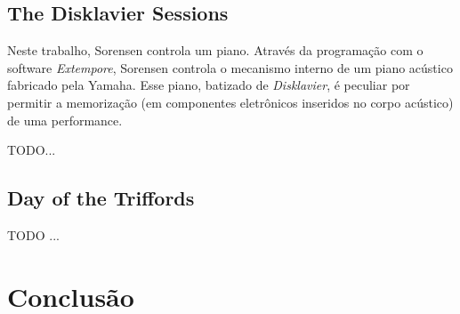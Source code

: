 \documentclass[
	12pt,				%
	openright,			%
	twoside,			%
	a4paper,			%
	english,			%
	french,				%
	spanish,			%
        italian,                        %
	brazil				%
	]{abntex2}
\begin{document}
\section{The Disklavier Sessions}

Neste trabalho, Sorensen controla um piano. Através da programação com o software \emph{Extempore}, Sorensen controla o mecanismo interno de um piano acústico fabricado pela Yamaha. Esse piano, batizado de \emph{Disklavier}, é peculiar por permitir a memorização (em componentes eletrônicos inseridos no corpo acústico) de uma performance.

TODO...

\section{Day of the Triffords}\label{sec:dayofthetriffords}

TODO ...
\chapter{Conclusão}


%
\postextual



%
%



\begin{apendicesenv}

%
%
%


\end{apendicesenv}


\printindex
\end{document}
